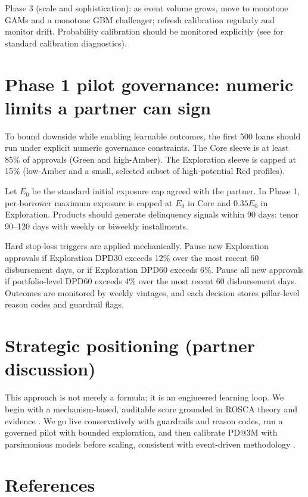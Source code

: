 \documentclass[11t]{article}
\begin{document}
Phase 3 (scale and sophistication): as event volume grows, move to monotone GAMs and a monotone GBM challenger; refresh calibration regularly and monitor drift. Probability calibration should be monitored explicitly (see \citealp{SklearnCalib} for standard calibration diagnostics).

\section{Phase 1 pilot governance: numeric limits a partner can sign}

To bound downside while enabling learnable outcomes, the first 500 loans should run under explicit numeric governance constraints. The Core sleeve is at least 85\% of approvals (Green and high-Amber). The Exploration sleeve is capped at 15\% (low-Amber and a small, selected subset of high-potential Red profiles).

Let $E_0$ be the standard initial exposure cap agreed with the partner. In Phase 1, per-borrower maximum exposure is capped at $E_0$ in Core and $0.35E_0$ in Exploration. Products should generate delinquency signals within 90 days: tenor 90--120 days with weekly or biweekly installments.

Hard stop-loss triggers are applied mechanically. Pause new Exploration approvals if Exploration DPD30 exceeds 12\% over the most recent 60 disbursement days, or if Exploration DPD60 exceeds 6\%. Pause all new approvals if portfolio-level DPD60 exceeds 4\% over the most recent 60 disbursement days. Outcomes are monitored by weekly vintages, and each decision stores pillar-level reason codes and guardrail flags.

\section{Strategic positioning (partner discussion)}

This approach is not merely a formula; it is an engineered learning loop. We begin with a mechanism-based, auditable score grounded in ROSCA theory and evidence \citet{BesleyCoateLoury1993,Gugerty2007,McNabbLeMayBoucherBonan2019,Klonner2003,CalomirisRajaraman1998,SchreinerNagarajan2000}. We go live conservatively with guardrails and reason codes, run a governed pilot with bounded exploration, and then calibrate PD@3M with parsimonious models before scaling, consistent with event-driven methodology \citet{RileyEtAl2020,VittinghoffMcCulloch2006}.

\clearpage
\section*{References}
\nocite{*}
\printbibliography
\end{document}
